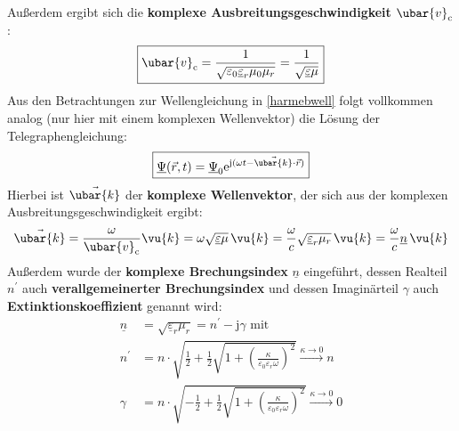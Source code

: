 		   Außerdem ergibt sich die \textbf{komplexe Ausbreitungsgeschwindigkeit} \( \ubar{v}_\mathrm{c}\):
		        \begin{equation}
			        \boxed{ \ubar{v}_\mathrm{c} = \frac{1}{\sqrt{\varepsilon_0\underline{\varepsilon}_r\mu_0\mu_r}} = \frac{1}{\sqrt{\underline{\varepsilon}\mu}}}
		        \end{equation}
		 Aus den Betrachtungen zur Wellengleichung in \ref{harmebwell} folgt vollkommen analog (nur hier mit einem komplexen Wellenvektor) die Lösung der Telegraphengleichung:
		        \begin{equation}
			        \boxed{\underline{\Psi}(\vec{r} , t) = \underline{\Psi}_0  \mathrm{e}^{\mathrm{j}(\omega t -  \vec{\ubar{k}}\cdot\vec{r} )}}
		        \end{equation}
		 Hierbei ist \( \vec{\ubar{k}}\) der \textbf{komplexe Wellenvektor}, der sich aus der komplexen Ausbreitungsgeschwindigkeit ergibt:
		        \begin{equation}
			        \vec{\ubar{k}} = \frac{\omega}{ \ubar{v}_\mathrm{c}} \vu{k} = \omega \sqrt{\underline{\varepsilon}\mu}\, \vu{k}= \frac{\omega}{c} \sqrt{\underline{\varepsilon}_r\mu_r}\, \vu{k} = \frac{\omega}{c} \underline{n}\, \vu{k}
		        \end{equation}
		  Außerdem wurde der \textbf{komplexe Brechungsindex} \(\underline{n}\) eingeführt, dessen Realteil $n^{\prime}$ auch \textbf{verallgemeinerter Brechungsindex} und dessen Imaginärteil $\gamma$ auch \textbf{Extinktionskoeffizient} genannt wird:
		        \begin{equation}\begin{split}
				        \underline{n} &= \sqrt{\underline{\varepsilon}_r\mu_r} = n^{\prime} - \mathrm{j}\gamma \text{ mit}\\
				        n^{\prime} &= n\cdot \sqrt{ \frac{1}{2}+\frac{1}{2}\sqrt{1+ \left( \frac{\kappa}{\varepsilon_0\varepsilon_r\omega} \right)^2} } \xrightarrow{\kappa\to 0} n \\
				        \gamma &= n \cdot \sqrt{-\frac{1}{2}+\frac{1}{2}\sqrt{1+ \left( \frac{\kappa}{\varepsilon_0\varepsilon_r\omega} \right)^2} } \xrightarrow{\kappa\to 0} 0 
			        \end{split}\end{equation}
